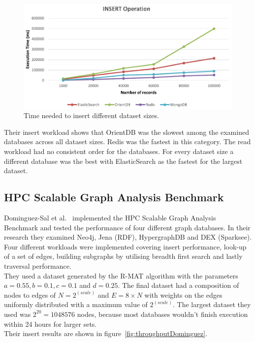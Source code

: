 \begin{figure}[h!]
  \centering
  \includegraphics{images/benchmarks/AbubakarInsertResults}
  \caption{Time needed to insert different dataset sizes.~\cite{Abubakar2014}}
  \label{fig:abubakarResults}
\end{figure}

Their insert workload shows that OrientDB was the slowest among the examined databases across all dataset sizes.
Redis was the fastest in this category.
The read workload had no consistent order for the databases.
For every dataset size a different database was the best with ElasticSearch as the fastest for the largest dataset.

\subsection{HPC Scalable Graph Analysis Benchmark}
Dominguez-Sal et al.~\cite{TaoShen} implemented the HPC Scalable Graph Analysis Benchmark and tested the performance of four different graph databases.
In their research they examined Neo4j, Jena (RDF), HypergraphDB and DEX (Sparksee).\\
Four different workloads were implemented covering insert performance, look-up of a set of edges, building subgraphs by utilising breadth first search and lastly traversal performance.\\
They used a dataset generated by the R-MAT algorithm with the parameters $ a = 0.55, b = 0.1, c = 0.1 $ and $ d = 0.25 $.
The final dataset had a composition of nodes to edges of $ N = 2^{(scale)} $ and $ E = 8 \times N $ with weights on the edges uniformly distributed with a maximum value of $ 2^{(scale)} $.
The largest dataset they used was $ 2^{20} = 1048576 $ nodes,
because most databases wouldn't finish execution within 24 hours for larger sets.\\
Their insert results are shown in figure~\ref{fig:throughputDominguez}.

